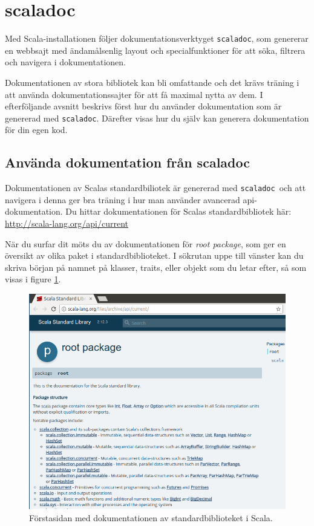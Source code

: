 \section{scaladoc}
\newcommand{\scaladoc}{\texttt{scaladoc}}

Med Scala-installationen följer dokumentationsverktyget \scaladoc, som genererar en webbsajt med ändamålsenlig layout och specialfunktioner för att söka, filtrera och navigera i dokumentationen.

Dokumentationen av stora bibliotek kan bli omfattande och det krävs träning i att använda dokumentationssajter för att få maximal nytta av dem. I efterföljande avsnitt beskrivs först hur du använder dokumentation som är genererad med \scaladoc. Därefter visas hur du själv kan generera dokumentation för din egen kod.


\subsection{Använda dokumentation från scaladoc}

Dokumentationen av Scalas standardbiliotek är genererad med \scaladoc\ och att navigera i denna ger bra träning i hur man använder avancerad api-dokumentation. Du hittar dokumentationen för Scalas standardbibliotek här: \\
\url{http://scala-lang.org/api/current}


När du surfar dit möts du av dokumentationen för \textit{root package}, som ger en översikt av olika paket i standardbiblioteket. I sökrutan uppe till vänster kan du skriva början på namnet på klasser, traits, eller objekt som du letar efter, så som visas i figure \ref{fig:scaladoc:root-package}.

\begin{figure}[H]
\centering
\includegraphics[width=1.0\textwidth]{../img/scaladoc/scaladoc-root}

     \caption{Förstasidan med dokumentationen av standardbiblioteket i Scala.}
    \label{fig:scaladoc:root-package}
\end{figure}

